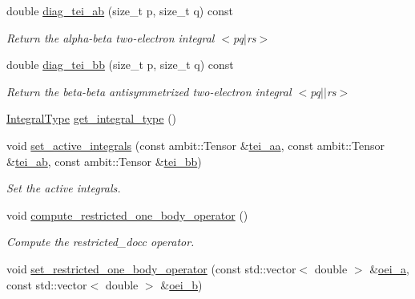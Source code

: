 \begin{DoxyCompactItemize}
double \mbox{\hyperlink{classforte_1_1_active_space_integrals_a35000e575a4872262b1cc481371ab11f}{diag\+\_\+tei\+\_\+ab}} (size\+\_\+t p, size\+\_\+t q) const
\begin{DoxyCompactList}\small\item\em Return the alpha-\/beta two-\/electron integral $<$pq$\vert$rs$>$ \end{DoxyCompactList}\item 
double \mbox{\hyperlink{classforte_1_1_active_space_integrals_aebc265d6a71280b33db9bc1e71ea32ca}{diag\+\_\+tei\+\_\+bb}} (size\+\_\+t p, size\+\_\+t q) const
\begin{DoxyCompactList}\small\item\em Return the beta-\/beta antisymmetrized two-\/electron integral $<$pq$\vert$$\vert$rs$>$ \end{DoxyCompactList}\item 
\mbox{\hyperlink{namespaceforte_a790e7e85ac0911c4c9494622496d95e6}{Integral\+Type}} \mbox{\hyperlink{classforte_1_1_active_space_integrals_aae0f53c04ea99da9626ed9908ea82900}{get\+\_\+integral\+\_\+type}} ()
\item 
void \mbox{\hyperlink{classforte_1_1_active_space_integrals_a8fdc3dcfc65590390c3da5a818eca12c}{set\+\_\+active\+\_\+integrals}} (const ambit\+::\+Tensor \&\mbox{\hyperlink{classforte_1_1_active_space_integrals_a41602985b2dd4fb879c21c7aab5d558f}{tei\+\_\+aa}}, const ambit\+::\+Tensor \&\mbox{\hyperlink{classforte_1_1_active_space_integrals_a5ba6a11664bc0f72e2a2508f76421ac9}{tei\+\_\+ab}}, const ambit\+::\+Tensor \&\mbox{\hyperlink{classforte_1_1_active_space_integrals_aac5d72add98a1f2583046687108941f6}{tei\+\_\+bb}})
\begin{DoxyCompactList}\small\item\em Set the active integrals. \end{DoxyCompactList}\item 
void \mbox{\hyperlink{classforte_1_1_active_space_integrals_a3cc7df1a53e31254342158a2080eabf5}{compute\+\_\+restricted\+\_\+one\+\_\+body\+\_\+operator}} ()
\begin{DoxyCompactList}\small\item\em Compute the restricted\+\_\+docc operator. \end{DoxyCompactList}\item 
void \mbox{\hyperlink{classforte_1_1_active_space_integrals_ab6ecdd7235c8bb3c573dfd7dbd4db890}{set\+\_\+restricted\+\_\+one\+\_\+body\+\_\+operator}} (const std\+::vector$<$ double $>$ \&\mbox{\hyperlink{classforte_1_1_active_space_integrals_a6463a779fa993faef6065c3bd3da1b1e}{oei\+\_\+a}}, const std\+::vector$<$ double $>$ \&\mbox{\hyperlink{classforte_1_1_active_space_integrals_aee9d0ef5878d538d922f702228fc5884}{oei\+\_\+b}})

\end{DoxyCompactItemize}
